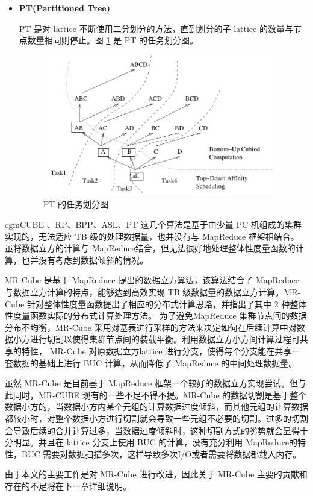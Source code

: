 \begin{itemize}
\item \textbf{PT(Partitioned Tree)}

PT 是对 lattice 不断使用二分划分的方法，直到划分的子 lattice 的数量与节点数量相同则停止。图 \ref{cluster_pt} 是 PT 的任务划分图。

\begin{figure}[!htb]
\centering\includegraphics[width=4in]{picture/ch_current_research/cluster_pt} 
\caption{PT 的任务划分图}\label{cluster_pt} 
\end{figure} 

\end{itemize}


cgmCUBE \cite{dehne2006cgmcube}、RP、BPP、ASL、PT\cite{lee2012efficient} 这几个算法是基于由少量 PC 机组成的集群实现的，无法适应 TB 级的处理数据量，也并没有与 MapReduce 框架相结合。 \cite{you2008parallel} \cite{sergey2009applying} 虽将数据立方的计算与 MapReduce结合，但无法很好地处理整体性度量函数的计算，也并没有考虑到数据倾斜的情况。

MR-Cube \cite{nandi2011distributed} 是基于 MapReduce 提出的数据立方算法，该算法结合了 MapReduce 与数据立方计算的特点，能够达到高效实现 TB 级数据量的数据立方计算。MR-Cube 针对整体性度量函数提出了相应的分布式计算思路，并指出了其中 2 种整体性度量函数实际的分布式计算处理方法。 为了避免MapReduce 集群节点间的数据分布不均衡，MR-Cube 采用对基表进行采样的方法来决定如何在后续计算中对数据小方进行切割以使得集群节点间的装载平衡。利用数据立方小方间计算过程可共享的特性， MR-Cube 对原数据立方lattice 进行分支，使得每个分支能在共享一套数据的基础上进行 BUC 计算，从而降低了 MapReduce 的中间处理数据量。

虽然 MR-Cube 是目前基于 MapReduce 框架一个较好的数据立方实现尝试。但与此同时，MR-CUBE 现有的一些不足不得不提。MR-Cube 的数据切割是基于整个数据小方的，当数据小方内某个元组的计算数据过度倾斜，而其他元组的计算数据都较小时，对整个数据小方进行切割就会导致一些元组不必要的切割。过多的切割会导致后续的合并计算过多，当数据过度倾斜时，这种切割方式的劣势就会显得十分明显。并且在 lattice 分支上使用 BUC 的计算，没有充分利用 MapReduce的特性，BUC 需要对数据扫描多次，这样导致多次I/O或者需要将数据都载入内存。

由于本文的主要工作是对 MR-Cube 进行改进，因此关于 MR-Cube 主要的贡献和存在的不足将在下一章详细说明。



